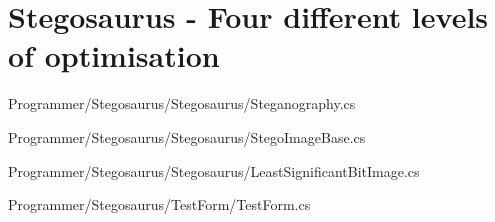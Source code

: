 \chapter{Stegosaurus - Four different levels of optimisation}
\label{app:E}
Programmer/Stegosaurus/Stegosaurus/Steganography.cs

Programmer/Stegosaurus/Stegosaurus/StegoImageBase.cs

Programmer/Stegosaurus/Stegosaurus/LeastSignificantBitImage.cs

Programmer/Stegosaurus/TestForm/TestForm.cs